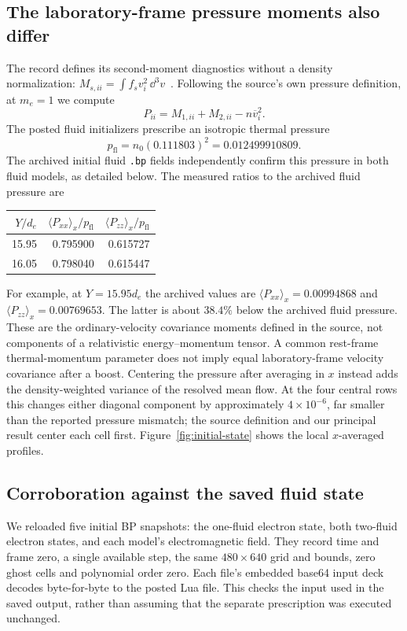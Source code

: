 \subsection{The laboratory-frame pressure moments also differ}
The record defines its second-moment diagnostics without a density
normalization: $M_{s,ii}=\int f_s v_i^2\,\dd^3v$~\cite{dataset}.
Following the source's own pressure definition, at $m_e=1$ we compute
\begin{equation}
 P_{ii}=M_{1,ii}+M_{2,ii}-n\overline v_i^2.
 \label{eq:archived-pressure}
\end{equation}
The posted fluid initializers prescribe an isotropic thermal pressure
\[
p_{\mathrm{fl}}=n_0(0.111803)^2=0.012499910809.
\]
The archived initial fluid \texttt{.bp} fields independently confirm this
pressure in both fluid models, as detailed below. The measured ratios to
the archived fluid pressure are
\begin{center}
\begin{tabular}{rrr}
\toprule
$Y/d_e$ & $\langle P_{xx}\rangle_x/p_{\mathrm{fl}}$ &
$\langle P_{zz}\rangle_x/p_{\mathrm{fl}}$ \\
\midrule
15.95 & 0.795900 & 0.615727 \\
16.05 & 0.798040 & 0.615447 \\
\bottomrule
\end{tabular}
\end{center}
For example, at $Y=15.95d_e$ the archived values are
$\langle P_{xx}\rangle_x=0.00994868$ and
$\langle P_{zz}\rangle_x=0.00769653$. The latter is about $38.4\%$ below
the archived fluid pressure. These are the ordinary-velocity covariance
moments defined in the source, not components of a relativistic
energy--momentum tensor. A common rest-frame thermal-momentum parameter
does not imply equal laboratory-frame velocity covariance after a boost.
Centering the pressure after averaging in $x$ instead adds the
density-weighted variance of the resolved mean flow. At the four central
rows this changes either diagonal component by approximately
$4\times10^{-6}$, far smaller than the reported pressure mismatch;
the source definition and our principal result center each cell first.
Figure~\ref{fig:initial-state} shows the local $x$-averaged profiles.

\subsection{Corroboration against the saved fluid state}
We reloaded five initial BP snapshots: the one-fluid electron state, both
two-fluid electron states, and each model's electromagnetic field. They
record time and frame zero, a single available step, the same
$480\times640$ grid and bounds, zero ghost cells and polynomial order zero.
Each file's embedded base64 input deck decodes byte-for-byte to the posted
Lua file. This checks the input used in the saved output, rather than assuming
that the separate prescription was executed unchanged.

